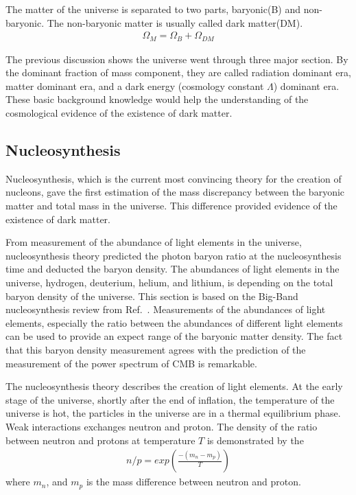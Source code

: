The matter of the universe is separated to two parts, baryonic(B) and non-baryonic. The non-baryonic matter is usually called dark matter(DM). 
\begin{align}
\Omega_{M} = \Omega_{B} + \Omega_{DM}
\end{align}


The previous discussion shows the universe went through three major section. By the dominant fraction of mass component, they are called radiation dominant era, matter dominant era, and a dark energy (cosmology constant $\Lambda$) dominant era. These basic background knowledge would help the understanding of the cosmological evidence of the existence of dark matter.

\subsection{Nucleosynthesis}
Nucleosynthesis, which is the current most convincing theory for the creation of nucleons, gave the first estimation of the mass discrepancy between the baryonic matter and total mass in the universe. This difference provided evidence of the existence of dark matter. 

From measurement of the abundance of light elements in the universe, nucleosynthesis theory predicted the photon baryon ratio at the nucleosynthesis time and deducted the baryon density. The abundances of light elements in the universe, hydrogen, deuterium, helium, and lithium, is depending on the total baryon density of the universe. This section is based on the Big-Band nucleosynthesis review from Ref.~\cite{Olive2014}. Measurements of the abundances of light elements, especially the ratio between the abundances of different light elements can be used to provide an expect range of the baryonic matter density. The fact that this baryon density measurement agrees with the prediction of the measurement of the power spectrum of CMB is remarkable.

The nucleosynthesis theory describes the creation of light elements. At the early stage of the universe, shortly after the end of inflation, the temperature of the universe is hot, the particles in the universe are in a thermal equilibrium phase. Weak interactions exchanges neutron and proton. The density of the ratio between neutron and protons at temperature $T$ is demonstrated by the 
\begin{align}
n/p = exp(\frac{-(m_n-m_p)}{T})
\end{align}
where $m_n$, and $m_p$ is the mass difference between neutron and proton. 

